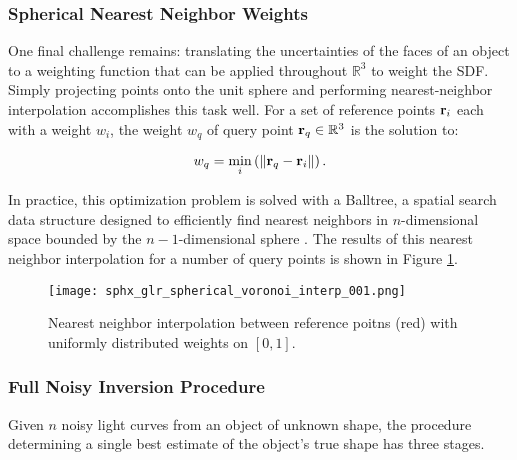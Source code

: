 \subsubsection{Spherical Nearest Neighbor Weights}

One final challenge remains: translating the uncertainties of the faces of an object to a weighting function that can be applied throughout $\mathbb{R}^3$ to weight the SDF. Simply projecting points onto the unit sphere and performing nearest-neighbor interpolation accomplishes this task well. For a set of reference points $\mathbf{r}_{i}$ each with a weight $w_i$, the weight $w_q$ of query point $\mathbf{r}_q \in \mathbb{R}^3$ is the solution to:

\begin{equation}
  w_q = \min_{i}\left( \| \mathbf{r}_q - \mathbf{r}_i \| \right).
\end{equation}

In practice, this optimization problem is solved with a Balltree, a spatial search data structure designed to efficiently find nearest neighbors in $n$-dimensional space bounded by the $n-1$-dimensional sphere \cite{omohundro1989}. The results of this nearest neighbor interpolation for a number of query points is shown in Figure \ref{fig:ball_tree_nn_interp}.

\begin{figure}[!htb]
  \centering
  \texttt{[image: sphx\_glr\_spherical\_voronoi\_interp\_001.png]}
  \caption{Nearest neighbor interpolation between reference poitns (red) with uniformly distributed weights on $[0,1]$.}
  \label{fig:ball_tree_nn_interp}
\end{figure}

\subsubsection{Full Noisy Inversion Procedure}

Given $n$ noisy light curves from an object of unknown shape, the procedure determining a single best estimate of the object's true shape has three stages. 

